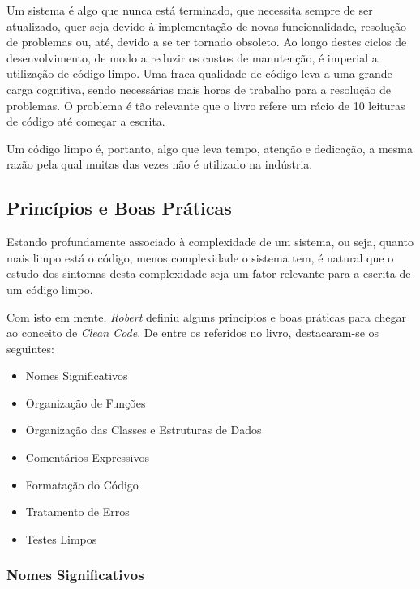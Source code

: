 \documentclass[10pt,portuguese]{article}
\begin{document}
\par Um sistema é algo que nunca está terminado, que necessita sempre de ser atualizado, quer seja devido à implementação de novas funcionalidade, resolução de problemas ou, até, devido a se ter tornado obsoleto. Ao longo destes ciclos de desenvolvimento, de modo a reduzir os custos de manutenção, é imperial a utilização de código limpo. Uma fraca qualidade de código leva a uma grande carga cognitiva, sendo necessárias mais horas de trabalho para a resolução de problemas. O problema 
é tão relevante que o livro refere um rácio de 10 leituras de código até começar a escrita.

\par Um código limpo é, portanto, algo que leva tempo, atenção e dedicação, a mesma razão pela qual muitas das vezes não é utilizado na indústria. 

\subsection{Princípios e Boas Práticas}

\par Estando profundamente associado à complexidade de um sistema, ou seja, quanto mais limpo está o código, menos complexidade o sistema tem, é natural que o estudo dos sintomas desta complexidade seja um fator relevante para a escrita de um código limpo. 

\par Com isto em mente, \textit{Robert} definiu alguns princípios e boas práticas para chegar ao conceito de \textit{Clean Code}.  De entre os referidos no livro, destacaram-se os seguintes:

\begin{itemize}
    \item Nomes Significativos
    \item Organização de Funções
    \item Organização das Classes e Estruturas de Dados
    \item Comentários Expressivos
    \item Formatação do Código
    \item Tratamento de Erros
    \item Testes Limpos
\end{itemize}

\subsubsection{Nomes Significativos}
\end{document}

